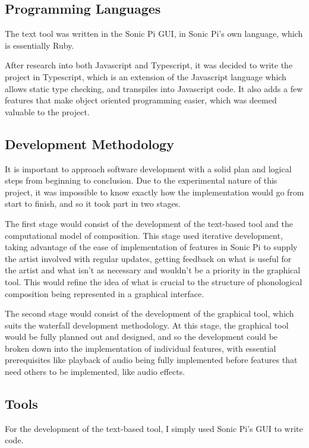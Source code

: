 \documentclass[12pt,a4paper,twoside,openright]{report}
\begin{document}
\subsection{Programming Languages}
The text tool was written in the Sonic Pi GUI, in Sonic Pi's own language, which is essentially Ruby.

After research into both Javascript and Typescript, it was decided to write the project in Typescript, which is an extension of the Javascript language which allows static type checking, and transpiles into Javascript code. It also adds a few features that make object oriented programming easier, which was deemed valuable to the project.

\subsection{Development Methodology}
It is important to approach software development with a solid plan and logical steps from beginning to conclusion. Due to the experimental nature of this project, it was impossible to know exactly how the implementation would go from start to finish, and so it took part in two stages. 

The first stage would consist of the development of the text-based tool and the computational model of composition. This stage used iterative development, taking advantage of the ease of implementation of features in Sonic Pi to supply the artist involved with regular updates, getting feedback on what is useful for the artist and what isn't as necessary and wouldn't be a priority in the graphical tool. This would refine the idea of what is crucial to the structure of phonological composition being represented in a graphical interface.

The second stage would consist of the development of the graphical tool, which suits the waterfall development methodology. At this stage, the graphical tool would be fully planned out and designed, and so the development could be broken down into the implementation of individual features, with essential prerequisites like playback of audio being fully implemented before features that need others to be implemented, like audio effects.

\subsection{Tools}
For the development of the text-based tool, I simply used Sonic Pi's GUI to write code.
\end{document}

